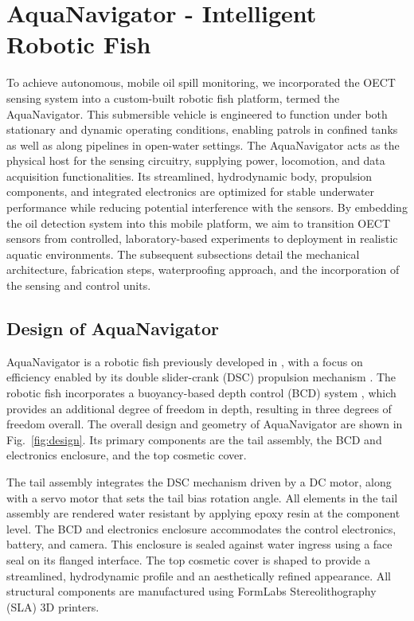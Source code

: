 \documentclass{iopjournal}
\begin{document}
\section{AquaNavigator - Intelligent Robotic Fish}
To achieve autonomous, mobile oil spill monitoring, we incorporated the OECT sensing system into a custom-built robotic fish platform, termed the AquaNavigator. This submersible vehicle is engineered to function under both stationary and dynamic operating conditions, enabling patrols in confined tanks as well as along pipelines in open-water settings. The AquaNavigator acts as the physical host for the sensing circuitry, supplying power, locomotion, and data acquisition functionalities. Its streamlined, hydrodynamic body, propulsion components, and integrated electronics are optimized for stable underwater performance while reducing potential interference with the sensors. By embedding the oil detection system into this mobile platform, we aim to transition OECT sensors from controlled, laboratory-based experiments to deployment in realistic aquatic environments. The subsequent subsections detail the mechanical architecture, fabrication steps, waterproofing approach, and the incorporation of the sensing and control units.

\subsection{Design of AquaNavigator}
AquaNavigator is a robotic fish previously developed in \cite{masood2025visual}, with a focus on efficiency enabled by its double slider-crank (DSC) propulsion mechanism \cite{Zuo2021}. The robotic fish incorporates a buoyancy-based depth control (BCD) system \cite{Masood2023}, which provides an additional degree of freedom in depth, resulting in three degrees of freedom overall. The overall design and geometry of AquaNavigator are shown in Fig.~\ref{fig:design}. Its primary components are the tail assembly, the BCD and electronics enclosure, and the top cosmetic cover. 

The tail assembly integrates the DSC mechanism driven by a DC motor, along with a servo motor that sets the tail bias rotation angle. All elements in the tail assembly are rendered water resistant by applying epoxy resin at the component level. The BCD and electronics enclosure accommodates the control electronics, battery, and camera. This enclosure is sealed against water ingress using a face seal on its flanged interface. The top cosmetic cover is shaped to provide a streamlined, hydrodynamic profile and an aesthetically refined appearance. All structural components are manufactured using FormLabs\texttrademark{} Stereolithography (SLA) 3D printers.
\end{document}

